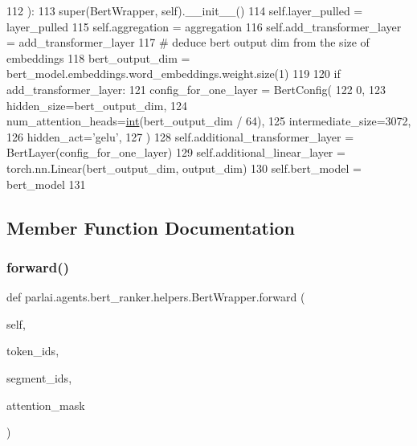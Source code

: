 \begin{DoxyCode}
112     ):
113         super(BertWrapper, self).\_\_init\_\_()
114         self.layer\_pulled = layer\_pulled
115         self.aggregation = aggregation
116         self.add\_transformer\_layer = add\_transformer\_layer
117         \textcolor{comment}{# deduce bert output dim from the size of embeddings}
118         bert\_output\_dim = bert\_model.embeddings.word\_embeddings.weight.size(1)
119 
120         \textcolor{keywordflow}{if} add\_transformer\_layer:
121             config\_for\_one\_layer = BertConfig(
122                 0,
123                 hidden\_size=bert\_output\_dim,
124                 num\_attention\_heads=\hyperlink{namespacelanguage__model_1_1eval__ppl_a7d12ee00479673c5c8d1f6d01faa272a}{int}(bert\_output\_dim / 64),
125                 intermediate\_size=3072,
126                 hidden\_act=\textcolor{stringliteral}{'gelu'},
127             )
128             self.additional\_transformer\_layer = BertLayer(config\_for\_one\_layer)
129         self.additional\_linear\_layer = torch.nn.Linear(bert\_output\_dim, output\_dim)
130         self.bert\_model = bert\_model
131 
\end{DoxyCode}


\subsection{Member Function Documentation}
\mbox{\label{classparlai_1_1agents_1_1bert__ranker_1_1helpers_1_1BertWrapper_a29a138ccda9ff978a641e5f6e0949009}} 
\subsubsection{\texorpdfstring{forward()}{forward()}}
{\footnotesize\ttfamily def parlai.\+agents.\+bert\+\_\+ranker.\+helpers.\+Bert\+Wrapper.\+forward (\begin{DoxyParamCaption}\item[{}]{self,  }\item[{}]{token\+\_\+ids,  }\item[{}]{segment\+\_\+ids,  }\item[{}]{attention\+\_\+mask }\end{DoxyParamCaption})}

